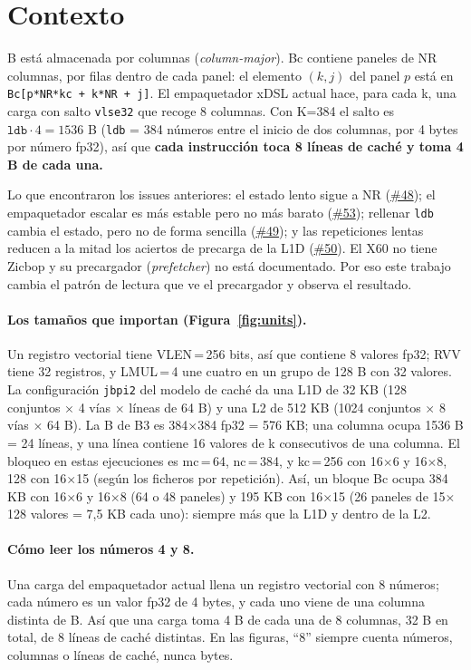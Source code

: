 \documentclass[10pt,a4paper]{article}
\newcommand{\iss}[1]{\href{https://github.com/JieGH/RVV_code_gen_via_MLIR_xDSL/issues/#1}{\##1}}
\newcommand{\key}[1]{\textbf{\textcolor{blue!55!black}{#1}}}  %
\begin{document}
\section{Contexto}
B está almacenada por columnas (\emph{column-major}). Bc contiene paneles de NR columnas, por filas dentro de cada panel: el elemento
$(k,j)$ del panel $p$ está en \texttt{Bc[p*NR*kc + k*NR + j]}. El empaquetador xDSL actual hace, para cada k, una carga con salto
\texttt{vlse32} que recoge 8 columnas. Con K=384 el salto es $\texttt{ldb}\cdot 4 = 1536$ B (\texttt{ldb} = 384 números entre el
inicio de dos columnas, por 4 bytes por número fp32), así que \key{cada instrucción toca 8 líneas de caché y toma 4 B de cada una.}

Lo que encontraron los issues anteriores: el estado lento sigue a NR (\iss{48}); el empaquetador escalar es más estable pero no más
barato (\iss{53}); rellenar \texttt{ldb} cambia el estado, pero no de forma sencilla (\iss{49}); y las repeticiones lentas reducen
a la mitad los aciertos de precarga de la L1D (\iss{50}). El X60 no tiene Zicbop y su precargador (\emph{prefetcher}) no está
documentado. Por eso este trabajo cambia el patrón de lectura que ve el precargador y observa el resultado.

\paragraph{Los tamaños que importan (Figura~\ref{fig:units}).} Un registro vectorial tiene VLEN\,=\,256 bits, así que contiene 8
valores fp32; RVV tiene 32 registros, y LMUL\,=\,4 une cuatro en un grupo de 128 B con 32 valores. La configuración \texttt{jbpi2} del
modelo de caché da una L1D de 32 KB (128 conjuntos $\times$ 4 vías $\times$ líneas de 64 B) y una L2 de 512 KB (1024 conjuntos
$\times$ 8 vías $\times$ 64 B). La B de B3 es 384$\times$384 fp32 = 576 KB; una columna ocupa 1536 B = 24 líneas, y una línea
contiene 16 valores de k consecutivos de una columna. El bloqueo en estas ejecuciones es mc\,=\,64, nc\,=\,384, y kc\,=\,256 con
16$\times$6 y 16$\times$8, 128 con 16$\times$15 (según los ficheros por repetición). Así, un bloque Bc ocupa 384 KB con 16$\times$6 y
16$\times$8 (64 o 48 paneles) y 195 KB con 16$\times$15 (26 paneles de 15$\times$128 valores = 7,5 KB cada uno): siempre más que la
L1D y dentro de la L2.

\paragraph{Cómo leer los números 4 y 8.} Una carga del empaquetador actual llena un registro vectorial con 8 números; cada número es
un valor fp32 de 4 bytes, y cada uno viene de una columna distinta de B. Así que una carga toma 4 B de cada una de 8 columnas, 32 B
en total, de 8 líneas de caché distintas. En las figuras, ``8'' siempre cuenta números, columnas o líneas de caché, nunca bytes.
\end{document}
